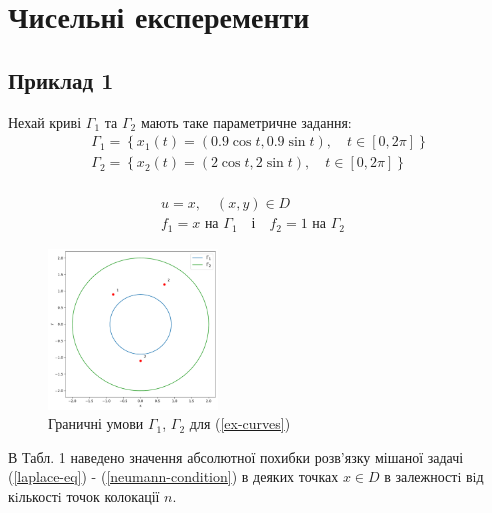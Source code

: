 \documentclass[14pt,a4paper]{extarticle}
\newcounter{e}
\numberwithin{equation}{section}
\numberwithin{figure}{section}
\begin{document}
 \newpage
 \thispagestyle{empty}
 \section{Чисельні експеременти} 
\subsection{Приклад 1}
Нехай криві $\Gamma_{1}$ та $\Gamma_{2}$ мають таке параметричне задання:
\begin{equation}
	\label{ex-curves}
	\begin{array}{l}
		\displaystyle
		\Gamma_{1}=\left\{x_{1}(t)=(0.9 \cos t, 0.9 \sin t), \quad t \in[0,2 
		\pi]\right\} \\
		
		\displaystyle
		\Gamma_{2}=\left\{x_{2}(t)=(2 \cos t, 2 \sin t), \quad  t \in[0,2 \pi]\right\} \\[0.1cm]
	\end{array}
\end{equation}

\begin{equation}
	\begin{array}{cr}
		\label{ex1}
		\displaystyle
		u = x, \quad (x, y) \in D   \\ [0.3cm]
		
		\displaystyle
		f_1 = x  \text { на } \Gamma_{1}
		\quad  \text {і}  \quad
		f_2 = 1  \text { на } \Gamma_{2} \quad
	\end{array}
\end{equation}

\begin{figure}[h]
	\includegraphics[width=0.4\textwidth]{resources/curves_and_points.pdf}
	\centering
	\caption{Граничні умови $\Gamma_1$, $\Gamma_2$ для (\ref{ex-curves})}
\end{figure}

В Табл. 1 наведено значення абсолютної похибки розв’язку мішаної задачі (\ref{laplace-eq}) - (\ref{neumann-condition}) в деяких точках $x \in D$ в залежностi вiд кiлькостi точок колокації $n$.
\end{document}

